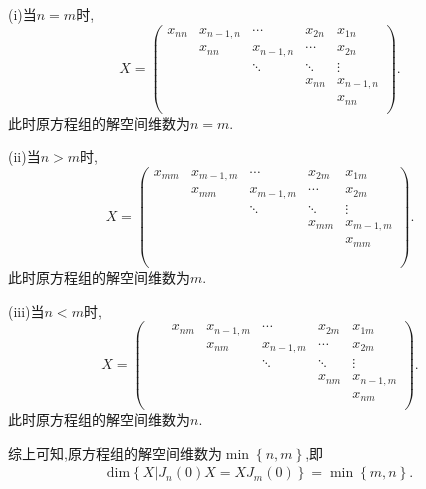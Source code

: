 \documentclass[../../main.tex]{subfiles}
\begin{document}
\begin{solution}
(i)当$n=m$时,
\[
X=\left( \begin{matrix}
x_{nn}&		x_{n-1,n}&		\cdots&		x_{2n}&		x_{1n}\\
&		x_{nn}&		x_{n-1,n}&		\cdots&		x_{2n}\\
&		&		\ddots&		\ddots&		\vdots\\
&		&		&		x_{nn}&		x_{n-1,n}\\
&		&		&		&		x_{nn}\\
\end{matrix} \right) .
\] 
此时原方程组的解空间维数为$n=m$.

(ii)当$n>m$时,
\[
X=\left( \begin{matrix}
x_{mm}&		x_{m-1,m}&		\cdots&		x_{2m}&		x_{1m}\\
&		x_{mm}&		x_{m-1,m}&		\cdots&		x_{2m}\\
&		&		\ddots&		\ddots&		\vdots\\
&		&		&		x_{mm}&		x_{m-1,m}\\
&		&		&		&		x_{mm}\\
&		&		&		&		\\
&		&		&		&		\\
\end{matrix} \right) .
\] 
此时原方程组的解空间维数为$m$.

(iii)当$n<m$时,
\[
X=\left( \begin{matrix}
	&		&		x_{nm}&		x_{n-1,m}&		\cdots&		x_{2m}&		x_{1m}\\
	&		&		&		x_{nm}&		x_{n-1,m}&		\cdots&		x_{2m}\\
	&		&		&		&		\ddots&		\ddots&		\vdots\\
	&		&		&		&		&		x_{nm}&		x_{n-1,m}\\
	&		&		&		&		&		&		x_{nm}\\
\end{matrix} \right) .
\] 
此时原方程组的解空间维数为$n $.

综上可知,原方程组的解空间维数为$\min \left\{ n,m \right\} $,即
\begin{align*}
\mathrm{dim}\left\{ X|J_n\left( 0 \right) X=XJ_m\left( 0 \right) \right\} =\min \left\{ m,n \right\} .
\end{align*}

\end{solution}
\end{document}
